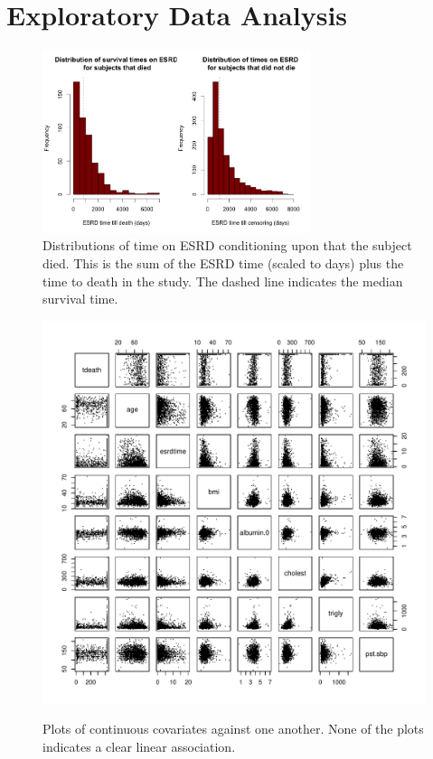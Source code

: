 \documentclass[paper=a4, fontsize=11pt]{scrartcl} %
\numberwithin{equation}{section} %
\numberwithin{figure}{section} %
\numberwithin{table}{section} %
\begin{document}
\pagebreak

\appendix

\section{Exploratory Data Analysis}

\begin{figure}[H]
\centering
\includegraphics[width=0.7\textwidth]{plots/esrdtimetilldeath_hist.png}
\caption{Distributions of time on ESRD conditioning upon that the subject died. This is the sum of the ESRD time (scaled to days) plus the time to death in the study. The dashed line indicates the median survival time.}
\label{fig:esrdtimetilldeath_hist}
\end{figure}

\begin{figure}[H]
\centering
\caption{Plots of continuous covariates against one another. None of the plots indicates a clear linear association.}
\includegraphics[width=.8\textwidth]{plots/pairs.pdf}
\label{fig:pairs}
\end{figure}
\end{document}
